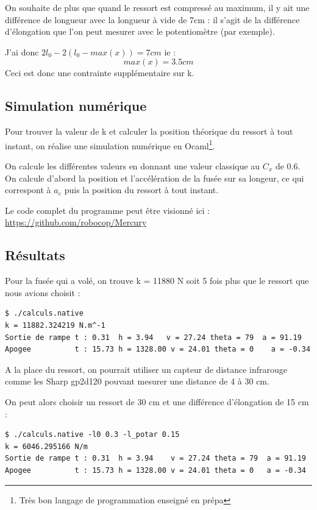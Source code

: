 \documentclass[a4paper,12pt]{scrartcl}
\begin{document}
	On souhaite de plus que quand le ressort est compressé au maximum, il y ait une différence de longueur avec la longueur à vide de 7cm : il s'agit de la différence d'élongation que l'on peut mesurer avec le potentiomètre (par exemple).

	J'ai donc $2 l_0 - 2(l_0-max(x)) = 7cm$ ie : $$max(x) = 3.5 cm$$
	Ceci est donc une contrainte supplémentaire sur k.

	\subsection{Simulation numérique}

	Pour trouver la valeur de k et calculer la position théorique du ressort à tout instant, on réalise une simulation numérique en 	Ocaml\footnote{Très bon langage de programmation enseigné en prépa}.

	On calcule les différentes valeurs en donnant une valeur classique au $C_x$ de 0.6.
	On calcule d'abord la position et l'accélération de la fusée sur sa longeur, ce qui correspont à ${a_e}$ puis la position du ressort 		à tout instant.

	Le code complet du programme peut être visionné ici : \url{https://github.com/robocop/Mercury}

	\subsection{Résultats}

	Pour la fusée qui a volé, on trouve k = 11880 N soit 5 fois plus que le ressort que nous avions choisit : 
	\begin{lstlisting}
$ ./calculs.native 
k = 11882.324219 N.m^-1
Sortie de rampe t : 0.31  h = 3.94 	 v = 27.24 theta = 79  a = 91.19 
Apogee          t : 15.73 h = 1328.00 v = 24.01 theta = 0	 a = -0.34 
	\end{lstlisting}

	A la place du ressort, on pourrait utiliser un capteur de distance infrarouge comme les Sharp gp2d120 pouvant mesurer une distance de 4 à 30 cm.
	\newpage
	
	On peut alors choisir un ressort de 30 cm et une différence d'élongation de 15 cm : 
	\begin{lstlisting}
$ ./calculs.native -l0 0.3 -l_potar 0.15
k = 6046.295166 N/m
Sortie de rampe t : 0.31  h = 3.94    v = 27.24 theta = 79  a = 91.19 
Apogee          t : 15.73 h = 1328.00 v = 24.01 theta = 0   a = -0.34 
	\end{lstlisting}
\end{document}
